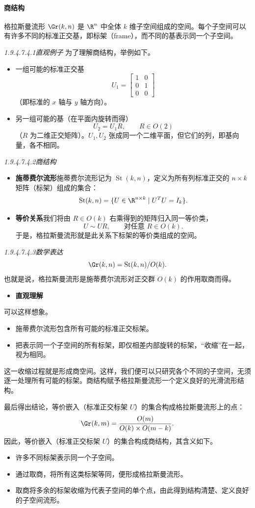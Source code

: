 \paragraph{商结构}
格拉斯曼流形 $\Gr(k,n)$ 是 $\R^n$ 中全体 $k$ 维子空间组成的空间。每个子空间可以有许多不同的标准正交基，即标架（frame），而不同的基表示同一个子空间。

\smallskip
\noindent\textit{1.9.4.7.4.1\quad 直观例子}\quad
为了理解商结构，举例如下。
\begin{itemize}
  \item 一组可能的标准正交基
  \[
    U_1=\begin{bmatrix}1&0\\0&1\\0&0\end{bmatrix}
  \]
  （即标准的 $x$ 轴与 $y$ 轴方向）。
  \item 另一组可能的基（在平面内旋转而得）
  \[
    U_2=U_1R,\qquad R\in O(2)
  \]
  （$R$ 为二维正交矩阵）。$U_1,U_2$ 张成同一个二维平面，但它们的列，即基向量，各不相同。
\end{itemize}

\smallskip
\noindent\textit{1.9.4.7.4.2\quad 商结构}
\begin{itemize}
  \item \textbf{施蒂费尔流形}\quad 施蒂费尔流形记为 $\operatorname{St}(k,n)$，定义为所有列标准正交的 $n\times k$ 矩阵（标架）组成的集合：
  \[
    \operatorname{St}(k,n)=\{U\in\R^{n\times k}\mid U^TU=I_k\}.
  \]
  \item \textbf{等价关系}\quad 我们将由 $R\in O(k)$ 右乘得到的矩阵归入同一等价类，
  \[
    U\sim UR,\qquad \text{对任意 }R\in O(k).
  \]
  于是，格拉斯曼流形就是此关系下标架的等价类组成的空间。
\end{itemize}

\smallskip
\noindent\textit{1.9.4.7.4.3\quad 数学表达}
\[
  \Gr(k,n)=\operatorname{St}(k,n)/O(k).
\]
也就是说，格拉斯曼流形是施蒂费尔流形对正交群 $O(k)$ 的作用取商而得。

\begin{itemize}
  \item \textbf{直观理解}
\end{itemize}
可以这样想象。
\begin{itemize}
  \item 施蒂费尔流形包含所有可能的标准正交标架。
  \item 把表示同一个子空间的所有标架，即仅相差内部旋转的标架，“收缩”在一起，视为相同。
\end{itemize}
这一收缩过程就是形成商空间。这样，我们便可以只研究各个不同的子空间，无须逐一处理所有可能的标架。商结构赋予格拉斯曼流形一个定义良好的光滑流形结构。

最后得出结论，等价嵌入（标准正交标架 $U$）的集合构成格拉斯曼流形上的点：
\[
  \Gr(k,m)=\frac{O(m)}{O(k)\times O(m-k)}.
\]
因此，等价嵌入（标准正交标架 $U$）的集合构成商结构，其含义如下。
\begin{itemize}
  \item 许多不同标架表示同一个子空间。
  \item 通过取商，将所有这类标架等同，便形成格拉斯曼流形。
  \item 取商将多余的标架收缩为代表子空间的单个点，由此得到结构清楚、定义良好的子空间流形。
\end{itemize}
